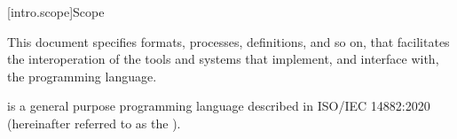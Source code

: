 
[intro.scope]{Scope}

\pnum
{}%
This document specifies formats, processes, definitions, and so on, that
facilitates the interoperation of the tools and systems that implement, and
interface with, the \Cpp{} programming language.

\pnum
\Cpp{} is a general purpose programming language described in ISO/IEC 14882:2020
 (hereinafter referred to as the
).
